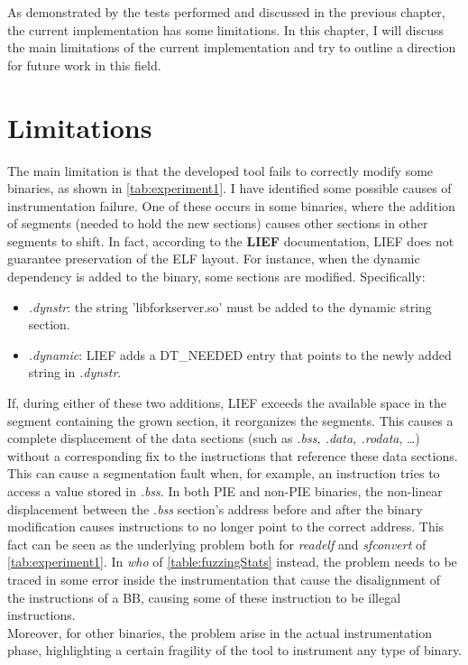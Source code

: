 As demonstrated by the tests performed and discussed in the previous chapter, the current implementation 
has some limitations.
In this chapter, I will discuss the main limitations of the current implementation and try to outline 
a direction for future work in this field.

\section{Limitations}
    The main limitation is that the developed tool fails to correctly modify some binaries, as 
    shown in \cref{tab:experiment1}.
    I have identified some possible causes of instrumentation failure.
    One of these occurs in some binaries, where the addition of segments (needed to hold the new sections) 
    causes other sections in other segments to shift.
    In fact, according to the \textbf{LIEF} documentation, LIEF does not guarantee preservation of the \gls{ELF} layout.
    For instance, when the dynamic dependency is added to the binary, some sections are modified. Specifically:
\begin{itemize}
\item \textit{.dynstr}: the string 'libforkserver.so' must be added to the dynamic string section.
\item \textit{.dynamic}: LIEF adds a DT\_NEEDED entry that points to the newly added string in \textit{.dynstr}.
\end{itemize}
    If, during either of these two additions, LIEF exceeds the available space in the segment containing the 
    grown section, it reorganizes the segments.
    This causes a complete displacement of the data sections (such as \textit{.bss, .data, .rodata}, \dots) 
    without a corresponding fix to the instructions that reference these data sections.
    This can cause a segmentation fault when, for example, an instruction tries to access a value stored 
    in \textit{.bss}.
    In both PIE and non-PIE binaries, the non-linear displacement between the \textit{.bss} section's address 
    before and after the binary modification causes instructions to no longer point to the correct address.
    This fact can be seen as the underlying problem both for \textit{readelf} and \textit{sfconvert} of \cref{tab:experiment1}. 
    In \textit{who} of \cref{table:fuzzingStats} instead, the problem needs to be traced in some error inside the instrumentation 
    that cause the disalignment of the instructions of a \gls{BB}, causing some of these instruction to be illegal instructions.\\ 
    Moreover, for other binaries, the problem arise in the actual instrumentation phase, highlighting a certain fragility 
    of the tool to instrument any type of binary.

